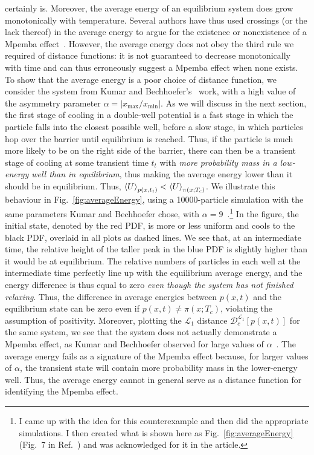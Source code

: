 \documentclass[hyperref={colorlinks=true, urlcolor=blue, citecolor=blue, final, bound}]{sfuthesis}
\begin{document}
certainly is. Moreover, the average energy of an equilibrium system does grow monotonically with temperature. Several authors have thus used crossings (or the lack thereof) in the average energy to argue for the existence or nonexistence of a Mpemba effect~\cite{Ohga2024,BaityJesi2019,Vadakkayil2021}. However, the average energy does not obey the third rule we required of distance functions: it is not guaranteed to decrease monotonically with time and can thus erroneously suggest a Mpemba effect when none exists. To show that the average energy is a poor choice of distance function, we consider the system from Kumar and Bechhoefer's~\cite{Kumar2020} work, with a high value of the asymmetry parameter $\alpha=|x_{\max}/x_{\min}|$. As we will discuss in the next section, the first stage of cooling in a double-well potential is a fast stage in which the particle falls into the closest possible well, before a slow stage, in which particles hop over the barrier until equilibrium is reached. Thus, if the particle is much more likely to be on the right side of the barrier, there can then be a transient stage of cooling at some transient time $t_t$ with \textit{more probability mass in a low-energy well than in equilibrium}, thus making the average energy lower than it should be in equilibrium. Thus, $\ev{U}_{p(x,t_t)} < \ev{U}_{\pi(x;T_c)}$. We illustrate this behaviour in Fig.~\ref{fig:averageEnergy}, using a \num{10000}-particle simulation with the same parameters Kumar and Bechhoefer chose, with $\alpha=9$~\cite{Kumar2020}.\footnote{I came up with the idea for this counterexample and then did the appropriate simulations. I then created what is shown here as Fig.~\ref{fig:averageEnergy} (Fig.~7 in Ref.~\cite{Teza2023}) and was acknowledged for it in the article.} In the figure, the initial state, denoted by the red PDF, is more or less uniform and cools to the black PDF, overlaid in all plots as dashed lines. We see that, at an intermediate time, the relative height of the taller peak in the blue PDF is slightly higher than it would be at equilibrium. The relative numbers of particles in each well at the intermediate time perfectly line up with the equilibrium average energy, and the energy difference is thus equal to zero \textit{even though the system has not finished relaxing}. Thus, the difference in average energies between $p(x,t)$ and the equilibrium state can be zero even if $p(x,t)\neq \pi(x;T_c)$, violating the assumption of positivity. Moreover, plotting the $\mathcal L_1$ distance $\mathcal D_c^{\mathcal L_1}[p(x,t)]$ for the same system, we see that the system does not actually demonstrate a Mpemba effect, as Kumar and Bechhoefer observed for large values of $\alpha$~\cite{Kumar2020}. The average energy fails as a signature of the Mpemba effect because, for larger values of $\alpha$, the transient state will contain more probability mass in the lower-energy well. Thus, the average energy cannot in general serve as a distance function for identifying the Mpemba effect.
\end{document}
